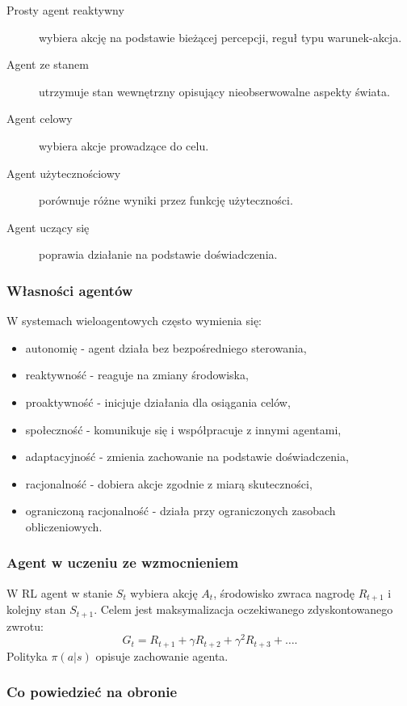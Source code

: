 \begin{description}
  \item[Prosty agent reaktywny] wybiera akcję na podstawie bieżącej percepcji, reguł typu warunek-akcja.
  \item[Agent ze stanem] utrzymuje stan wewnętrzny opisujący nieobserwowalne aspekty świata.
  \item[Agent celowy] wybiera akcje prowadzące do celu.
  \item[Agent użytecznościowy] porównuje różne wyniki przez funkcję użyteczności.
  \item[Agent uczący się] poprawia działanie na podstawie doświadczenia.
\end{description}

\subsubsection{Własności agentów}

W systemach wieloagentowych często wymienia się:
\begin{itemize}
  \item autonomię - agent działa bez bezpośredniego sterowania,
  \item reaktywność - reaguje na zmiany środowiska,
  \item proaktywność - inicjuje działania dla osiągania celów,
  \item społeczność - komunikuje się i współpracuje z innymi agentami,
  \item adaptacyjność - zmienia zachowanie na podstawie doświadczenia,
  \item racjonalność - dobiera akcje zgodnie z miarą skuteczności,
  \item ograniczoną racjonalność - działa przy ograniczonych zasobach obliczeniowych.
\end{itemize}

\subsubsection{Agent w uczeniu ze wzmocnieniem}

W RL agent w stanie $S_t$ wybiera akcję $A_t$, środowisko zwraca nagrodę $R_{t+1}$ i kolejny stan $S_{t+1}$. Celem jest maksymalizacja oczekiwanego zdyskontowanego zwrotu:
\[
G_t=R_{t+1}+\gamma R_{t+2}+\gamma^2R_{t+3}+\dots.
\]
Polityka $\pi(a|s)$ opisuje zachowanie agenta.

\subsubsection{Co powiedzieć na obronie}

